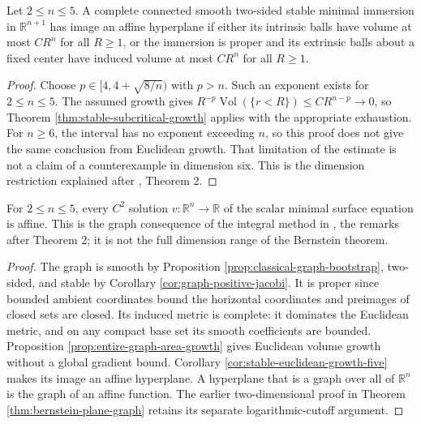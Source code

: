 \begin{corollary}\label{cor:stable-euclidean-growth-five}
Let $2\leq n\leq5$. A complete connected smooth two-sided stable minimal immersion in $\mathbb R^{n+1}$ has image an affine hyperplane if either its intrinsic balls have volume at most $CR^n$ for all $R\geq1$, or the immersion is proper and its extrinsic balls about a fixed center have induced volume at most $CR^n$ for all $R\geq1$.
\end{corollary}
\begin{proof}
Choose $p\in[4,4+\sqrt{8/n})$ with $p>n$. Such an exponent exists for $2\leq n\leq5$. The assumed growth gives $R^{-p}\operatorname{Vol}(\{r<R\})\leq CR^{n-p}\to0$, so Theorem \ref{thm:stable-subcritical-growth} applies with the appropriate exhaustion. For $n\geq6$, the interval has no exponent exceeding $n$, so this proof does not give the same conclusion from Euclidean growth. That limitation of the estimate is not a claim of a counterexample in dimension six. This is the dimension restriction explained after \cite{SSY75}, Theorem 2.
\end{proof}

\begin{corollary}\label{cor:bernstein-through-five}
For $2\leq n\leq5$, every $C^2$ solution $v:\mathbb R^n\to\mathbb R$ of the scalar minimal surface equation is affine. This is the graph consequence of the integral method in \cite{SSY75}, the remarks after Theorem 2; it is not the full dimension range of the Bernstein theorem.
\end{corollary}
\begin{proof}
The graph is smooth by Proposition \ref{prop:classical-graph-bootstrap}, two-sided, and stable by Corollary \ref{cor:graph-positive-jacobi}. It is proper since bounded ambient coordinates bound the horizontal coordinates and preimages of closed sets are closed. Its induced metric is complete: it dominates the Euclidean metric, and on any compact base set its smooth coefficients are bounded. Proposition \ref{prop:entire-graph-area-growth} gives Euclidean volume growth without a global gradient bound. Corollary \ref{cor:stable-euclidean-growth-five} makes its image an affine hyperplane. A hyperplane that is a graph over all of $\mathbb R^n$ is the graph of an affine function. The earlier two-dimensional proof in Theorem \ref{thm:bernstein-plane-graph} retains its separate logarithmic-cutoff argument.
\end{proof}
